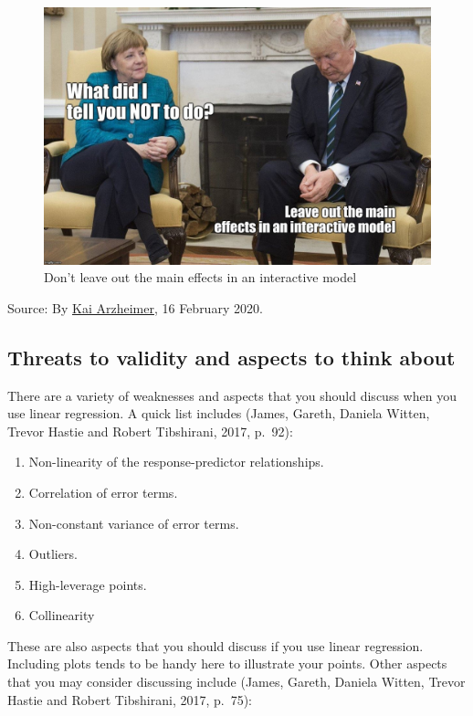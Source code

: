 \documentclass[
]{book}
\providecommand{\tightlist}{%
  \setlength{\itemsep}{0pt}\setlength{\parskip}{0pt}}
\begin{document}
\begin{figure}
\includegraphics[width=0.9\linewidth]{figures/trump} \caption{Don't leave out the main effects in an interactive model}\label{fig:trump}
\end{figure}

Source: By \href{https://twitter.com/kai_arzheimer/status/1228998718646607876}{Kai Arzheimer}, 16 February 2020.

\hypertarget{threats-to-validity-and-aspects-to-think-about}{%
\subsection{Threats to validity and aspects to think about}\label{threats-to-validity-and-aspects-to-think-about}}

There are a variety of weaknesses and aspects that you should discuss when you use linear regression. A quick list includes (James, Gareth, Daniela Witten, Trevor Hastie and Robert Tibshirani, 2017, p.~92):

\begin{enumerate}
\def\labelenumi{\arabic{enumi}.}
\tightlist
\item
  Non-linearity of the response-predictor relationships.
\item
  Correlation of error terms.
\item
  Non-constant variance of error terms.
\item
  Outliers.
\item
  High-leverage points.
\item
  Collinearity
\end{enumerate}

These are also aspects that you should discuss if you use linear regression. Including plots tends to be handy here to illustrate your points. Other aspects that you may consider discussing include (James, Gareth, Daniela Witten, Trevor Hastie and Robert Tibshirani, 2017, p.~75):
\end{document}
